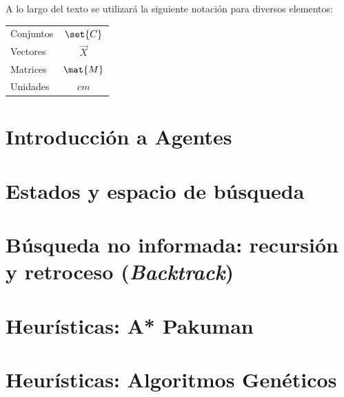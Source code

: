 \documentclass[12pt,openany]{book}
\begin{document}
A lo largo del texto se utilizará la siguiente notación para diversos elementos:
\begin{longtable}{lc}
 Conjuntos   &   $\set{C}$ \\
 Vectores    &   $\vec{X}$ \\
 Matrices    &   $\mat{M}$ \\
 Unidades    &   $\unit{cm}$
\end{longtable}



\chapter{Introducción a Agentes}





\chapter{Estados y espacio de búsqueda}





\chapter[Retroceso]{Búsqueda no informada: recursión y retroceso (\textit{Backtrack})}






\chapter{Heurísticas: A* Pakuman}





\chapter{Heurísticas: Algoritmos Genéticos}


\end{document}
